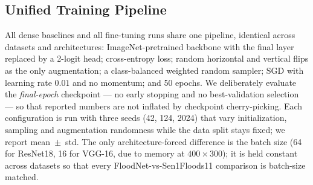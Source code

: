 \documentclass[conference]{IEEEtran}
\newif\ifreview
\newcommand{\REV}[1]{\ifreview\textcolor{red}{\textbf{[Revise: #1]}}\fi}
\newcommand{\HL}[1]{\ifreview\colorbox{yellow!55}{#1}\else #1\fi}
\begin{document}
\subsection{Unified Training Pipeline}
All dense baselines and all fine-tuning runs share one pipeline,
identical across datasets and architectures: ImageNet-pretrained
backbone \cite{deng2009imagenet} with the final layer replaced by a
2-logit head; cross-entropy loss; random horizontal and vertical flips
as the only augmentation; a class-balanced weighted random sampler;
SGD with learning rate $0.01$ and no momentum; and 50 epochs. We
deliberately evaluate the \emph{final-epoch} checkpoint --- no
early stopping and no best-validation selection --- so that reported
numbers are not inflated by checkpoint cherry-picking. Each
configuration is run with three seeds (42, 124, 2024) that vary
initialization, sampling and augmentation randomness while the data
split stays fixed; we report mean~$\pm$~std. The only
architecture-forced difference is the batch size (64 for ResNet18, 16
for VGG-16, due to memory at $400\times300$); it is held constant
across datasets so that every FloodNet-vs-Sen1Floods11 comparison is
batch-size matched.
\REV{[A9] Add: GPU model, PyTorch/torchvision versions, wall-clock per
run, \HL{weight decay (none?)}, loss weights, and whether BatchNorm
layers are in train mode during fine-tuning. State which std is used:
the VGG numbers (e.g., accuracy $0.661\pm0.230$) match the
\emph{population} std (ddof$=0$); with $n{=}3$ use the sample std
(ddof$=1$, which gives $\approx0.28$ here) or report min--max. Be
consistent across all tables. [B4] ``SGD, no momentum, lr 0.01'' is an
unusual recipe; reviewers will ask why. Justify it, or add the
control in B4. [B5] Three seeds on a 199/221-image evaluation set is
thin: raise ResNet18 to 5 seeds and add a Welch $t$-test or bootstrap
95\% CI for the key comparisons (struct.\ 50\% FloodNet vs.\ SAR).
[B8] VGG-16 here has no BatchNorm; a reviewer will say the dense SAR
failure is a recipe problem. Add one sentence acknowledging this and,
if time allows, one VGG-16-BN dense run.}
\end{document}
